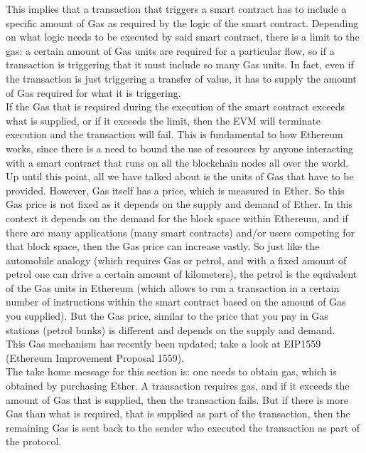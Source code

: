 This implies that a transaction that triggers a smart contract has to include a specific amount of Gas as required by the logic of the smart contract.
Depending on what logic needs to be executed by said smart contract, there is a limit to the gas: a certain amount of Gas units are required for a particular flow, so if a transaction is triggering that it must include so many Gas units.
In fact, even if the transaction is just triggering a transfer of value, it has to supply the amount of Gas required for what it is triggering.\\

If the Gas that is required during the execution of the smart contract exceeds what is supplied, or if it exceeds the limit, then the EVM will terminate execution and the transaction will fail.
This is fundamental to how Ethereum works, since there is a need to bound the use of resources by anyone interacting with a smart contract that runs on all the blockchain nodes all over the world.\\

Up until this point, all we have talked about is the units of Gas that have to be provided.
However, Gas itself has a price, which is measured in Ether.
So this Gas price is not fixed as it depends on the supply and demand of Ether.
In this context it depends on the demand for the block space within Ethereum, and if there are many applications (many smart contracts) and/or users competing for that block space, then the Gas price can increase vastly.
So just like the automobile analogy (which requires Gas or petrol, and with a fixed amount of petrol one can drive a certain amount of kilometers), the petrol is the equivalent of the Gas units in Ethereum (which allows to run a transaction in a certain number of instructions within the smart contract based on the amount of Gas you supplied).
But the Gas price, similar to the price that you pay in Gas stations (petrol bunks) is different and depends on the supply and demand.\\

This Gas mechanism has recently been updated; take a look at EIP1559 (Ethereum Improvement Proposal 1559).\\

The take home message for this section is: one needs to obtain gas, which is obtained by purchasing Ether.
A transaction requires gas, and if it exceeds the amount of Gas that is supplied, then the transaction fails.
But if there is more Gas than what is required, that is supplied as part of the transaction, then the remaining Gas is sent back to the sender who executed the transaction as part of the protocol. 

